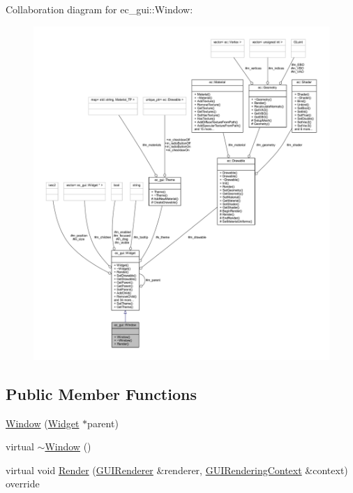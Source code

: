Collaboration diagram for ec\+\_\+gui\+:\+:Window\+:\nopagebreak
\begin{figure}[H]
\begin{center}
\leavevmode
\includegraphics[width=350pt]{classec__gui_1_1_window__coll__graph}
\end{center}
\end{figure}
\subsection*{Public Member Functions}
\begin{DoxyCompactItemize}
\item 
\mbox{\hyperlink{classec__gui_1_1_window_a7841453949917ebed1df39cbd1f77532}{Window}} (\mbox{\hyperlink{classec__gui_1_1_widget}{Widget}} $\ast$parent)
\item 
virtual \mbox{\hyperlink{classec__gui_1_1_window_a9a8b81905961bb2a8761ed1770253b20}{$\sim$\+Window}} ()
\item 
virtual void \mbox{\hyperlink{classec__gui_1_1_window_ab8c5a4f6f2104d7619f90362d0c43385}{Render}} (\mbox{\hyperlink{classec__gui_1_1_g_u_i_renderer}{G\+U\+I\+Renderer}} \&renderer, \mbox{\hyperlink{classec__gui_1_1_g_u_i_rendering_context}{G\+U\+I\+Rendering\+Context}} \&context) override
\end{DoxyCompactItemize}

